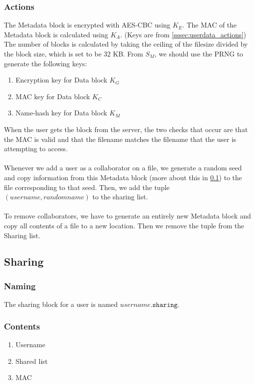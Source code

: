 \documentclass{article}
\begin{document}
\subsubsection{Actions}
\label{sssec:meta_actions}
The Metadata block is encrypted with AES-CBC using $K_E$.
The MAC of the Metadata block is calculated using $K_A$.
(Keys are from \ref{sssec:userdata_actions})
The number of blocks is calculated by taking the ceiling of the filesize divided by the block size,
which is set to be 32 KB.
From $S_M$, we should use the PRNG to generate the following keys:
\begin{enumerate}
\item Encryption key for Data block $K_G$
\item MAC key for Data block $K_C$
\item Name-hash key for Data block $K_M$
\end{enumerate}
When the user gets the block from the server, the two checks that occur are that the MAC is valid and that
the filename matches the filename that the user is attempting to access.
\\ \\
Whenever we add a user as a collaborator on a file, we generate a random seed and copy information from
this Metadata block (more about this in \ref{ssec:sharing}) to the file corresponding to that seed.
Then, we add the tuple $(username,randomname)$ to the sharing list.
\\ \\
To remove collaborators, we have to generate an entirely new Metadata block and copy all contents of a file
to a new location.
Then we remove the tuple from the Sharing list.

\subsection{Sharing}
\label{ssec:sharing}
\subsubsection{Naming}
The sharing block for a user is named $username\texttt{.sharing}$.

\subsubsection{Contents}
\begin{enumerate}
\item Username
\item Shared list
\item MAC
\end{enumerate}
\end{document}
